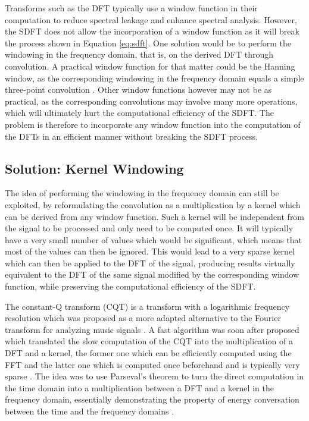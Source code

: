\documentclass[journal]{IEEEtran}
\begin{document}
Transforms such as the DFT typically use a window function in their computation to reduce spectral leakage and enhance spectral analysis. However, the SDFT does not allow the incorporation of a window function as it will break the process shown in Equation \ref{eq:sdft}. One solution would be to perform the windowing in the frequency domain, that is, on the derived DFT through convolution. A practical window function for that matter could be the Hanning window, as the corresponding windowing in the frequency domain equals a simple three-point convolution \cite{jacobsen2003}. Other window functions however may not be as practical, as the corresponding convolutions may involve many more operations, which will ultimately hurt the computational efficiency of the SDFT. The problem is therefore to incorporate any window function into the computation of the DFTs in an efficient manner without breaking the SDFT process.


\subsection{Solution: Kernel Windowing}

The idea of performing the windowing in the frequency domain can still be exploited, by reformulating the convolution as a multiplication by a kernel which can be derived from any window function. Such a kernel will be independent from the signal to be processed and only need to be computed once. It will typically have a very small number of values which would be significant, which means that most of the values can then be ignored. This would lead to a very sparse kernel which can then be applied to the DFT of the signal, producing results virtually equivalent to the DFT of the same signal modified by the corresponding window function, while preserving the computational efficiency of the SDFT.

The constant-Q transform (CQT) is a transform with a logarithmic frequency resolution which was proposed as a more adapted alternative to the Fourier transform for analyzing music signals \cite{brown1991}. A fast algorithm was soon after proposed which translated the slow computation of the CQT into the multiplication of a DFT and a kernel, the former one which can be efficiently computed using the FFT and the latter one which is computed once beforehand and is typically very sparse \cite{brown1992}. The idea was to use Parseval's theorem to turn the direct computation in the time domain into a multiplication between a DFT and a kernel in the frequency domain, essentially demonstrating the property of energy conversation between the time and the frequency domains \cite{oppenheim1975}.
\end{document}
